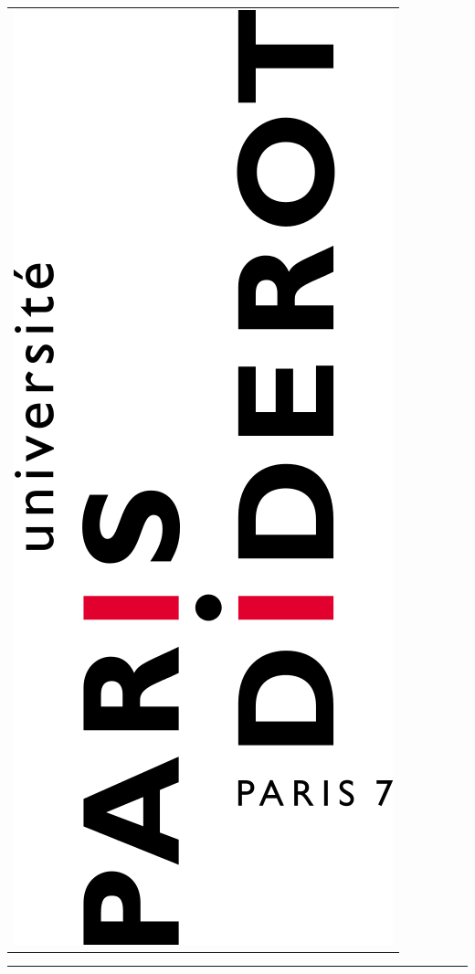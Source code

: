 \documentclass[12pt,a4paper]{article}
\newcommand{\HRule}{\rule{\linewidth}{0.5mm}}
\begin{document}
\begin{titlepage}
\begin{sffamily}
\begin{center}
\begin{tabular}{c}
		\includegraphics[scale=0.1]{img/p7.png}
	\end{tabular}
    \HRule \\[0.2cm]
    { \huge \bfseries {}\\[0.4cm]}

\end{center}
\end{sffamily}
\end{titlepage}
\end{document}
